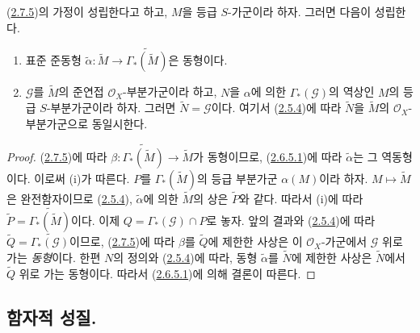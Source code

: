 \begin{proposition}[2.7.11]
\label{II.2.7.11-ko}
(\hyperref[II.2.7.5-ko]{2.7.5})의 가정이 성립한다고 하고, $M$을 등급
$S$-가군이라 하자. 그러면 다음이 성립한다.
\begin{enumerate}
  \item[\rm(i)] 표준 준동형
    $\widetilde{\alpha}:\widetilde{M}\to
    \widetilde{\Gamma_*(\widetilde{M})}$은 동형이다.
  \item[\rm(ii)] $\mathcal{G}$를 $\widetilde{M}$의 준연접
    $\mathcal{O}_X$-부분가군이라 하고, $N$을 $\alpha$에 의한
    $\Gamma_*(\mathcal{G})$의 역상인 $M$의 등급 $S$-부분가군이라 하자.
    그러면 $\widetilde{N}=\mathcal{G}$이다. 여기서
    (\hyperref[II.2.5.4-ko]{2.5.4})에 따라 $\widetilde{N}$을
    $\widetilde{M}$의 $\mathcal{O}_X$-부분가군으로 동일시한다.
\end{enumerate}
\end{proposition}

\begin{proof}
(\hyperref[II.2.7.5-ko]{2.7.5})에 따라
$\beta:\widetilde{\Gamma_*(\widetilde{M})}\to\widetilde{M}$가 동형이므로,
(\hyperref[II.2.6.5.1-ko]{2.6.5.1})에 따라 $\widetilde{\alpha}$는 그
역동형이다. 이로써 (i)가 따른다. $P$를 $\Gamma_*(\widetilde{M})$의 등급
부분가군 $\alpha(M)$이라 하자. $M\mapsto\widetilde{M}$은 완전함자이므로
(\hyperref[II.2.5.4-ko]{2.5.4}), $\widetilde{\alpha}$에 의한
$\widetilde{M}$의 상은 $\widetilde{P}$와 같다. 따라서 (i)에 따라
$\widetilde{P}=\widetilde{\Gamma_*(\widetilde{M})}$이다. 이제
$Q=\Gamma_*(\mathcal{G})\cap P$로 놓자. 앞의 결과와
(\hyperref[II.2.5.4-ko]{2.5.4})에 따라
$\widetilde{Q}=\widetilde{\Gamma_*(\mathcal{G})}$이므로,
(\hyperref[II.2.7.5-ko]{2.7.5})에 따라 $\beta$를 $\widetilde{Q}$에 제한한
사상은 이 $\mathcal{O}_X$-가군에서 $\mathcal{G}$ 위로 가는
\emph{동형}이다. 한편 $N$의 정의와
(\hyperref[II.2.5.4-ko]{2.5.4})에 따라, 동형 $\widetilde{\alpha}$를
$\widetilde{N}$에 제한한 사상은 $\widetilde{N}$에서
$\widetilde{Q}$ 위로 가는 동형이다. 따라서
(\hyperref[II.2.6.5.1-ko]{2.6.5.1})에 의해 결론이 따른다.
\end{proof}

\subsection{함자적 성질.}
\label{subsection:II.2.8-ko}

